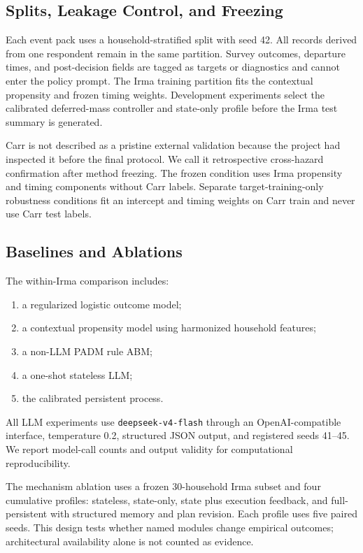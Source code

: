 \documentclass[journal]{IEEEtran}
\begin{document}
\subsection{Splits, Leakage Control, and Freezing}
Each event pack uses a household-stratified split with seed 42. All records
derived from one respondent remain in the same partition. Survey outcomes,
departure times, and post-decision fields are tagged as targets or diagnostics
and cannot enter the policy prompt. The Irma training partition fits the
contextual propensity and frozen timing weights. Development experiments
select the calibrated deferred-mass controller and state-only profile before
the Irma test summary is generated.

Carr is not described as a pristine external validation because the project
had inspected it before the final protocol. We call it retrospective
cross-hazard confirmation after method freezing. The frozen condition uses
Irma propensity and timing components without Carr labels. Separate
target-training-only robustness conditions fit an intercept and timing weights
on Carr train and never use Carr test labels.

\subsection{Baselines and Ablations}
The within-Irma comparison includes:
\begin{enumerate}
    \item a regularized logistic outcome model;
    \item a contextual propensity model using harmonized household features;
    \item a non-LLM PADM rule ABM;
    \item a one-shot stateless LLM;
    \item the calibrated persistent process.
\end{enumerate}
All LLM experiments use \texttt{deepseek-v4-flash} through an
OpenAI-compatible interface, temperature 0.2, structured JSON output, and
registered seeds 41--45. We report model-call counts and output validity for
computational reproducibility.

The mechanism ablation uses a frozen 30-household Irma subset and four
cumulative profiles:
stateless, state-only, state plus execution feedback, and full-persistent with
structured memory and plan revision. Each profile uses five paired seeds. This
design tests whether named modules change empirical outcomes; architectural
availability alone is not counted as evidence.
\end{document}
